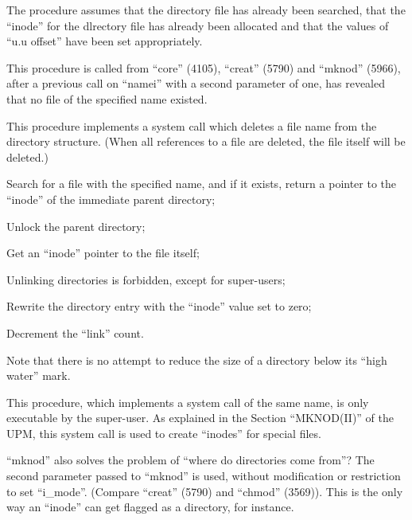 The procedure assumes that  the  directory  file  has  already been searched,
that the ``inode'' for the dlrectory file
has already been allocated and that the
values of ``u.u offset''  have  been  set
appropriately.


This procedure is  called  from  ``core''
(4105),   ``creat''  (5790)  and  ``mknod''
(5966),  after  a  previous   call   on
``namei'' with a second parameter of one,
has revealed that no file of the specified name existed.



This procedure implements a system call
which  deletes  a  file  name  from the
directory structure.  (When all  references  to  a file are deleted, the file
itself will be deleted.)

\bd
\item[3515:] Search for a file with the specified
 name,  and  if  it  exists,
return a pointer to  the  ``inode''
of  the  immediate  parent directory;


\item[3518:] Unlock the parent directory;

\item[3519:] Get an  ``inode''  pointer  to  the
file itself;

\item[3522:] Unlinking directories is  forbidden, except for super-users;

\item[3528:] Rewrite the directory entry  with
      the ``inode'' value set to zero;

\item[3529:] Decrement the ``link'' count.
\ed


Note that there is no attempt to reduce
the size of a directory below its ``high
water'' mark.



This procedure, which implements a system call
of the same name, is only executable by the super-user. As explained
in  the Section ``MKNOD(II)'' of the UPM,
this system  call  is  used  to  create
``inodes'' for special files.

``mknod''  also  solves  the  problem  of
``where  do directories come from''?  The
second parameter passed to  ``mknod''  is
used,  without modification or restriction to set ``i\_mode''.
(Compare  ``creat'' (5790)  and  ``chmod''  (3569)).  This is
the only way an ``inode'' can get flagged
as a directory, for instance.

